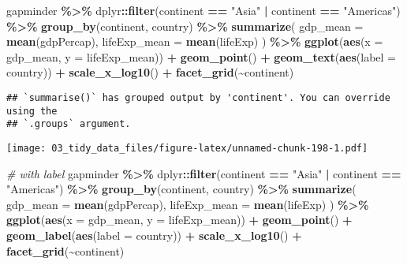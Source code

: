\documentclass[
]{book}
\newenvironment{Shaded}{\begin{snugshade}}{\end{snugshade}}
\newcommand{\CommentTok}[1]{\textcolor[rgb]{0.56,0.35,0.01}{\textit{#1}}}
\newcommand{\DataTypeTok}[1]{\textcolor[rgb]{0.13,0.29,0.53}{#1}}
\newcommand{\KeywordTok}[1]{\textcolor[rgb]{0.13,0.29,0.53}{\textbf{#1}}}
\newcommand{\NormalTok}[1]{#1}
\newcommand{\OperatorTok}[1]{\textcolor[rgb]{0.81,0.36,0.00}{\textbf{#1}}}
\newcommand{\StringTok}[1]{\textcolor[rgb]{0.31,0.60,0.02}{#1}}
\begin{document}
\begin{Shaded}
\begin{Highlighting}[]
\NormalTok{gapminder }\OperatorTok{\%\textgreater{}\%}
\StringTok{  }\NormalTok{dplyr}\OperatorTok{::}\KeywordTok{filter}\NormalTok{(continent }\OperatorTok{==}\StringTok{ "Asia"} \OperatorTok{|}\StringTok{ }\NormalTok{continent }\OperatorTok{==}\StringTok{ "Americas"}\NormalTok{) }\OperatorTok{\%\textgreater{}\%}
\StringTok{  }\KeywordTok{group\_by}\NormalTok{(continent, country) }\OperatorTok{\%\textgreater{}\%}
\StringTok{  }\KeywordTok{summarize}\NormalTok{(}
    \DataTypeTok{gdp\_mean =} \KeywordTok{mean}\NormalTok{(gdpPercap),}
    \DataTypeTok{lifeExp\_mean =} \KeywordTok{mean}\NormalTok{(lifeExp)}
\NormalTok{  ) }\OperatorTok{\%\textgreater{}\%}
\StringTok{  }\KeywordTok{ggplot}\NormalTok{(}\KeywordTok{aes}\NormalTok{(}\DataTypeTok{x =}\NormalTok{ gdp\_mean, }\DataTypeTok{y =}\NormalTok{ lifeExp\_mean)) }\OperatorTok{+}
\StringTok{  }\KeywordTok{geom\_point}\NormalTok{() }\OperatorTok{+}
\StringTok{  }\KeywordTok{geom\_text}\NormalTok{(}\KeywordTok{aes}\NormalTok{(}\DataTypeTok{label =}\NormalTok{ country)) }\OperatorTok{+}
\StringTok{  }\KeywordTok{scale\_x\_log10}\NormalTok{() }\OperatorTok{+}
\StringTok{  }\KeywordTok{facet\_grid}\NormalTok{(}\OperatorTok{\textasciitilde{}}\NormalTok{continent)}
\end{Highlighting}
\end{Shaded}

\begin{verbatim}
## `summarise()` has grouped output by 'continent'. You can override using the
## `.groups` argument.
\end{verbatim}

\texttt{[image: 03\_tidy\_data\_files/figure-latex/unnamed-chunk-198-1.pdf]}

\begin{Shaded}
\begin{Highlighting}[]
\CommentTok{\# with label}
\NormalTok{gapminder }\OperatorTok{\%\textgreater{}\%}
\StringTok{  }\NormalTok{dplyr}\OperatorTok{::}\KeywordTok{filter}\NormalTok{(continent }\OperatorTok{==}\StringTok{ "Asia"} \OperatorTok{|}\StringTok{ }\NormalTok{continent }\OperatorTok{==}\StringTok{ "Americas"}\NormalTok{) }\OperatorTok{\%\textgreater{}\%}
\StringTok{  }\KeywordTok{group\_by}\NormalTok{(continent, country) }\OperatorTok{\%\textgreater{}\%}
\StringTok{  }\KeywordTok{summarize}\NormalTok{(}
    \DataTypeTok{gdp\_mean =} \KeywordTok{mean}\NormalTok{(gdpPercap),}
    \DataTypeTok{lifeExp\_mean =} \KeywordTok{mean}\NormalTok{(lifeExp)}
\NormalTok{  ) }\OperatorTok{\%\textgreater{}\%}
\StringTok{  }\KeywordTok{ggplot}\NormalTok{(}\KeywordTok{aes}\NormalTok{(}\DataTypeTok{x =}\NormalTok{ gdp\_mean, }\DataTypeTok{y =}\NormalTok{ lifeExp\_mean)) }\OperatorTok{+}
\StringTok{  }\KeywordTok{geom\_point}\NormalTok{() }\OperatorTok{+}
\StringTok{  }\KeywordTok{geom\_label}\NormalTok{(}\KeywordTok{aes}\NormalTok{(}\DataTypeTok{label =}\NormalTok{ country)) }\OperatorTok{+}
\StringTok{  }\KeywordTok{scale\_x\_log10}\NormalTok{() }\OperatorTok{+}
\StringTok{  }\KeywordTok{facet\_grid}\NormalTok{(}\OperatorTok{\textasciitilde{}}\NormalTok{continent)}
\end{Highlighting}
\end{Shaded}
\end{document}
